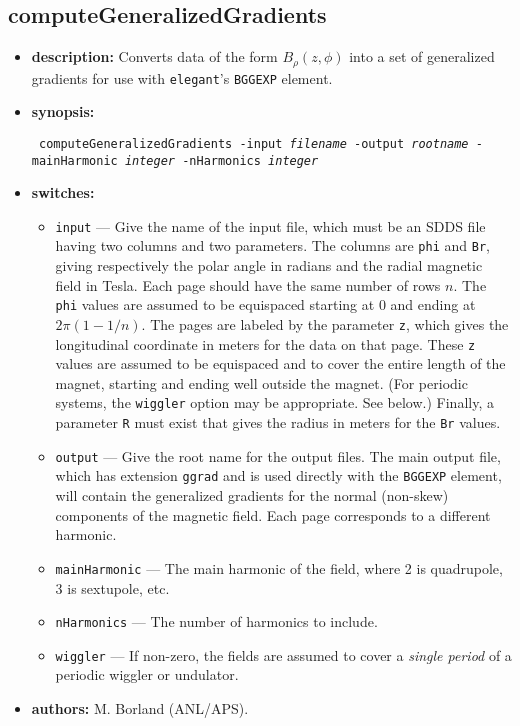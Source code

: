 \documentclass[11pt]{article}
\begin{document}
\subsection{computeGeneralizedGradients}

\begin{itemize}
\item {\bf description:}  Converts data of the form $B_\rho(z, \phi)$ into a set of generalized gradients \cite{Venturini-NIMA427-387} 
for use with {\tt elegant}'s \verb|BGGEXP| element.

\item {\bf synopsis:}
\begin{flushleft}{\tt
computeGeneralizedGradients -input {\em filename} -output {\em rootname} -mainHarmonic {\em integer} -nHarmonics {\em integer}
}\end{flushleft}

\item {\bf switches:}
\begin{itemize}
\item \verb|input| --- Give the name of the input file, which must be an SDDS file having two columns and two parameters.
The columns are \verb|phi| and \verb|Br|, giving respectively the polar angle in radians and the radial magnetic field in
Tesla. Each page should have the same number of rows $n$.
The \verb|phi| values are assumed to be equispaced starting at 0 and ending at $2\pi (1-1/n)$.
The pages are labeled by the parameter \verb|z|, which gives the longitudinal coordinate in meters for the data on that page.
These \verb|z| values are assumed to be equispaced and to cover the entire length of the magnet, starting and ending well outside
the magnet. (For periodic systems, the \verb|wiggler| option may be appropriate. See below.)
Finally, a parameter \verb|R| must exist that gives the radius in meters for the \verb|Br| values.

\item \verb|output| --- Give the root name for the output files. The main output file, which has extension \verb|ggrad|
 and is used directly with the \verb|BGGEXP| element, will contain the generalized gradients for the normal (non-skew)
 components of the magnetic field. Each page corresponds to a different harmonic.

\item \verb|mainHarmonic| --- The main harmonic of the field, where 2 is quadrupole, 3 is sextupole, etc.

\item \verb|nHarmonics| --- The number of harmonics to include.

\item \verb|wiggler| --- If non-zero, the fields are assumed to cover a {\em single period} of a periodic wiggler or
  undulator. 
\end{itemize}

\item {\bf authors:} M. Borland (ANL/APS).
\end{itemize}
\end{document}
